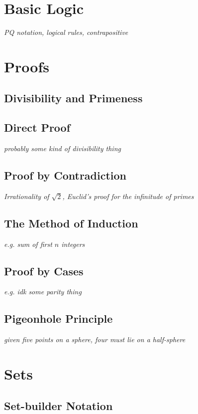 \documentclass[../../../main.tex]{subfiles}
\begin{document}

\section{Basic Logic}
\textit{PQ notation, logical rules, contrapositive}

\section{Proofs}
\subsection{Divisibility and Primeness}
\subsection{Direct Proof}
\textit{probably some kind of divisibility thing}
\subsection{Proof by Contradiction}
\textit{Irrationality of $\sqrt 2$, Euclid's proof for the infinitude of primes}
\subsection{The Method of Induction}
\textit{e.g. sum of first $n$ integers}
\subsection{Proof by Cases}
\textit{e.g. idk some parity thing}
\subsection{Pigeonhole Principle}
\textit{given five points on a sphere, four must lie on a half-sphere}

\section{Sets}
\subsection{Set-builder Notation}
\end{document}
